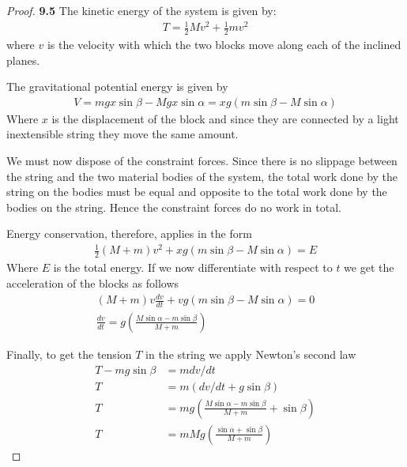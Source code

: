 \documentclass[11pt]{article}
\theoremstyle{definition}
\begin{document}
	\begin{proof}{\textbf{9.5}}
        The kinetic energy of the system is given by:
        \begin{align*}
            T = \frac{1}{2}Mv^2 + \frac{1}{2}mv^2
        \end{align*}
        where $v$ is the velocity with which the two blocks move along each
        of the inclined planes. 
    
        The gravitational potential energy is given by
        \begin{align*}
            V = mgx\sin\beta - Mgx\sin\alpha = xg(m\sin\beta - M\sin\alpha)
        \end{align*}
        Where $x$ is the displacement of the block and since they
        are connected by a light inextensible string they move the same amount.

        We must now dispose of the constraint forces. Since there is no
        slippage between the string and the two material bodies of the system,
        the total work done by the string on the bodies must be equal
        and opposite to the total work done by the bodies on the string.
        Hence the constraint forces do no work in total.

        Energy conservation, therefore, applies in the form
        \begin{align*}
            \frac{1}{2}(M+m)v^2 + xg(m\sin\beta - M\sin\alpha) = E
        \end{align*}
        Where $E$ is the total energy. If we now differentiate with respect to
        $t$ we get the acceleration of the blocks as follows
        \begin{align*}
            (M+m)v\frac{dv}{dt} + vg(m\sin\beta - M\sin\alpha) = 0\\
            \frac{dv}{dt} = g\left(\frac{M\sin\alpha - m\sin\beta}{M+m}\right)
        \end{align*}

        Finally, to get the tension $T$ in the string we apply Newton's second
        law
        \begin{align*}
            T - mg\sin\beta &= mdv/dt\\
            T &= m(dv/dt + g\sin\beta)\\
            T &= mg\left(\frac{M\sin\alpha - m\sin\beta}{M+m} + \sin\beta\right)\\
            T &= mMg \left(\frac{\sin\alpha + \sin\beta}{M+m}\right)
        \end{align*}
    \end{proof}
\end{document}
